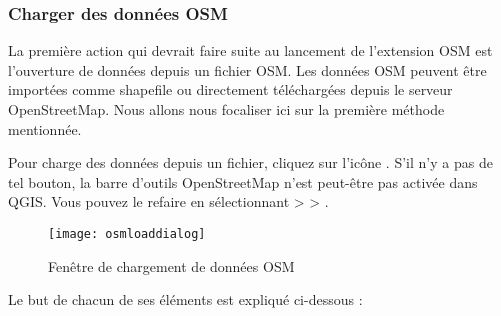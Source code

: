 \subsubsection{Charger des données OSM}

La première action qui devrait faire suite au lancement de l'extension OSM est l'ouverture de données depuis un fichier OSM. Les données OSM peuvent être importées comme shapefile ou directement téléchargées depuis le serveur OpenStreetMap. Nous allons nous focaliser ici sur la première méthode mentionnée.

Pour charge des données depuis un fichier, cliquez sur l'icône . S'il n'y a pas de tel bouton, la barre d'outils OpenStreetMap n'est peut-être pas activée dans QGIS. Vous pouvez le refaire en sélectionnant  >  > .

\begin{figure}[ht]
   \begin{center}
   \caption{Fenêtre de chargement de données OSM \nixcaption}\label{fig:osmload}\smallskip
   \texttt{[image: osmloaddialog]}
\end{center}
\end{figure}

Le but de chacun de ses éléments est expliqué ci-dessous :

